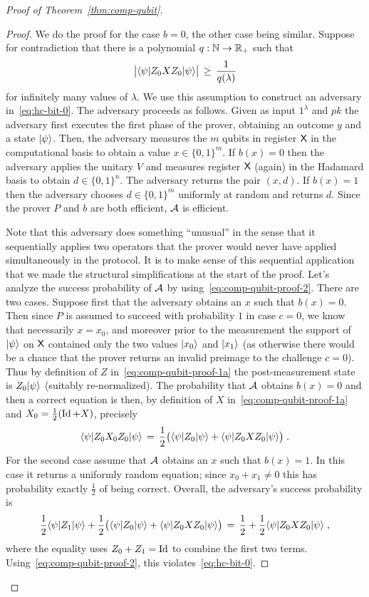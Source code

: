 \begin{proof}[Proof of Theorem~\ref{thm:comp-qubit}]
\begin{proof}
We do the proof for the case $b=0$, the other case being similar. Suppose for contradiction that there is a polynomial $q:\mathbb{N}\to\mathbb{R}_+$ such that 
\begin{equation}\label{eq:comp-qubit-proof-2}
\big| \langle\psi| Z_0 X Z_0 |\psi\rangle \big| \,\geq\, \frac{1}{q(\lambda)}
\end{equation} 
for infinitely many values of $\lambda$. We use this assumption to construct an adversary in~\eqref{eq:hc-bit-0}. The adversary proceeds as follows. Given as input $1^\lambda$ and $pk$ the adversary first executes the first phase of the prover, obtaining an outcome $y$ and a state $|\psi\rangle$. Then, the adversary measures the $m$ qubits in register ${\textsf{X}}$ in the computational basis to obtain a value $x\in \{0,1\}^m$. If $b(x)=0$ then the adversary applies the unitary $V$ and measures register ${\textsf{X}}$ (again) in the Hadamard basis to obtain $d\in \{0,1\}^n$. The adversary returns the pair $(x,d)$. If $b(x)=1$ then the adversary chooses $d\in\{0,1\}^m$ uniformly at random and returns $d$. Since the prover $P$ and $b$ are both efficient, $\mathcal{A}$ is efficient. 

Note that this adversary does something ``unusual'' in the sense that it sequentially applies two operators that the prover would  never have applied simultaneously in the protocol. It is to make sense of this sequential application that we made the structural simplifications at the start of the proof. Let's analyze the success probability of $\mathcal{A}$ by using~\eqref{eq:comp-qubit-proof-2}. There are two cases. Suppose first that the adversary obtains an $x$ such that $b(x)=0$. Then since $P$ is assumed to succeed with probability $1$ in case $c=0$, we know that necessarily $x=x_0$, and moreover prior to the measurement the support of $|\psi\rangle$ on ${\textsf{X}}$ contained only the two values $|x_0\rangle$ and $|x_1\rangle$ (as otherwise there would be a chance that the prover returns an invalid preimage to the challenge $c=0$). Thus by definition of $Z$ in~\eqref{eq:comp-qubit-proof-1a} the post-measurement state is $Z_0|\psi\rangle$ (suitably re-normalized). The probability that $\mathcal{A}$ obtains $b(x)=0$ and then a correct equation is then, by definition of $X$ in~\eqref{eq:comp-qubit-proof-1a} and $X_0 = \frac{1}{2}(\mathop{\rm Id}\nolimits + X)$, precisely 
\[ \langle\psi| Z_0 X_0 Z_0 |\psi\rangle \,=\, \frac{1}{2} \big( \langle\psi|Z_0|\psi\rangle + \langle\psi| Z_0 X Z_0 |\psi\rangle \big) \;.\]
For the second case assume that $\mathcal{A}$ obtains an $x$ such that $b(x)=1$. In this case it returns a uniformly random equation; since $x_0+ x_1\neq 0$ this has probability exactly $\frac{1}{2}$ of being correct. Overall, the adversary's success probability is 
\[ \frac{1}{2}\langle\psi|Z_1|\psi\rangle +  \frac{1}{2}\big( \langle\psi|Z_0|\psi\rangle + \langle\psi| Z_0 X Z_0 |\psi\rangle \big) \,=\, \frac{1}{2} + \frac{1}{2}\langle\psi| Z_0 X Z_0 |\psi\rangle\;,\]
where the equality uses $Z_0+Z_1=\mathop{\rm Id}\nolimits$ to combine the first two terms. Using~\eqref{eq:comp-qubit-proof-2}, this violates~\eqref{eq:hc-bit-0}. 
\end{proof}



\end{proof}
